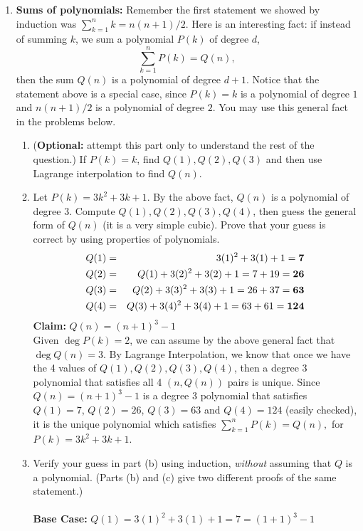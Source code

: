 \documentclass[11pt,fleqn]{article}
\begin{document}
\begin{enumerate}
\newpage
\item \textbf{Sums of polynomials:}
Remember the first statement we showed by induction was $\sum_{k = 1}^n k = n(n+1)/2$. 
Here is an interesting fact: if instead of summing $k$, we sum a polynomial $P(k)$ of degree $d$,
$$\sum_{k = 1}^n P(k) = Q(n),$$ then the sum $Q(n)$ is a polynomial of degree $d+1$. 
Notice that the statement above is a special case, since $P(k) = k$ is a polynomial of degree $1$ 
and $n(n+1)/2$ is a polynomial of degree $2$. 
You may use this general fact in the problems below.
\begin{enumerate}
\item (\textbf{Optional:} attempt this part only to understand the rest of the question.)
If $P(k) = k$, find $Q(1), Q(2), Q(3)$ and then use Lagrange interpolation to find $Q(n)$.
\item Let $P(k) = 3k^2 + 3k + 1$. By the above fact, $Q(n)$ is a polynomial of degree $3$. 
Compute $Q(1), Q(2), Q(3), Q(4)$,
then guess the general form of $Q(n)$ (it is a very simple cubic).
Prove that your guess is correct by using properties of polynomials. \\
\begin{eqnarray*}
Q(1) &=& 3(1)^2 + 3(1) + 1 = {\bf 7} \\
Q(2) &=& Q(1) + 3(2)^2 + 3(2) + 1 = 7 + 19 = {\bf 26} \\
Q(3) &=& Q(2) + 3(3)^2 + 3(3) + 1 = 26 + 37 = {\bf 63} \\
Q(4) &=& Q(3) + 3(4)^2 + 3(4) + 1 = 63 + 61 = {\bf 124}
\end{eqnarray*}
{\bf Claim:} $Q(n) = (n+1)^3 - 1$ \\
Given $\deg{P(k)} = 2$, we can assume by the above general fact that $\deg{Q(n)} = 3$. By Lagrange Interpolation, we know that once we have the 4 values of $Q(1), Q(2), Q(3), Q(4)$, then a degree 3 polynomial that satisfies all 4 $(n,Q(n))$ pairs is unique. Since $Q(n) = (n+1)^3 - 1$ is a degree 3 polynomial that satisfies $Q(1) = 7$, $Q(2) = 26$, $Q(3) = 63$ and $Q(4) = 124$ (easily checked), it is the unique polynomial which satisfies $\displaystyle\sum\limits_{k = 1}^n P(k) = Q(n),$ for $P(k) = 3k^2 + 3k + 1$.
\item Verify your guess in part (b) using induction,
\emph{without} assuming that $Q$ is a polynomial.
(Parts (b) and (c) give two different proofs of the same statement.) \\\\
{\bf Base Case:} $Q(1) = 3(1)^2 + 3(1) + 1 = 7 = (1+1)^3 - 1$ \\

\end{enumerate}
\end{enumerate}
\end{document}
